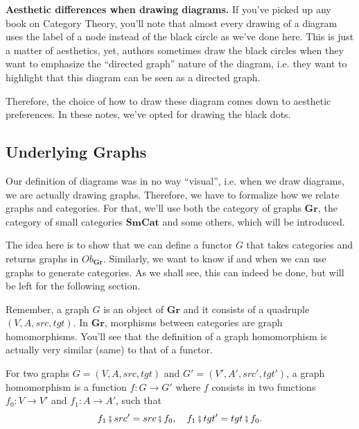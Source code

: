 \begin{shaded}
  \textbf{Aesthetic differences when drawing diagrams.}
  If you've picked up any book on Category Theory, you'll note that almost every
  drawing of a diagram uses the label of a node instead of the black circle
  as we've done here. This is just a matter of aesthetics, yet, authors
  sometimes draw the black circles when they want to emphasize the
  ``directed graph'' nature of the diagram, i.e. they want to highlight
  that this diagram can be seen as a directed graph.

  Therefore, the choice of how to draw these diagram comes down to
  aesthetic preferences. In these notes, we've opted for drawing the
  black dots.
\end{shaded}

\subsection{Underlying Graphs}

Our definition of diagrams was in no way ``visual'', i.e. when we draw
diagrams, we are actually drawing graphs. Therefore, we have to formalize how
we relate graphs and categories.
For that, we'll use both the
category of graphs $\mathbf{Gr}$, the category of small categories
$\mathbf{SmCat}$ and some others, which will be introduced.

The idea here is to show that we can define a functor
$G$ that takes categories and returns graphs in $Ob_\mathbf{Gr}$.
Similarly, we want to know if and when we can use graphs to generate categories.
As we shall see, this can indeed be done, but will be left for the following section.

Remember, a graph $G$ is an object of $\mathbf{Gr}$ and it
consists of a quadruple $(V, A, src, tgt)$. In $\mathbf{Gr}$, morphisms
between categories are graph homomorphisms. You'll see that the
definition of a graph homomorphism is actually very similar (same) to that of a functor.

\begin{definition}
  For two graphs $G=(V, A, src, tgt)$ and $G' = (V', A', src', tgt')$,
  a graph homomorphism is a function
  $f:G \to G'$ where $f$ consists in two functions $f_0:V\to V'$ and
  $f_1:A \to A'$, such that
  \begin{displaymath}
    f_1 \fatsemi src' = src \fatsemi f_0, \quad
    f_1 \fatsemi tgt' = tgt \fatsemi f_0.
  \end{displaymath}
\end{definition}

